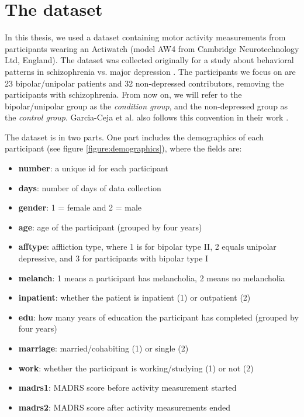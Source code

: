 %

\section{The dataset}

In this thesis, we used a dataset containing motor activity measurements from participants wearing an Actiwatch (model AW4 from Cambridge Neurotechnology Ltd, England). The dataset was collected originally for a study about behavioral patterns in schizophrenia vs. major depression \cite{Berle2010}. The participants we focus on are 23 bipolar/unipolar patients and 32 non-depressed contributors, removing the participants with schizophrenia. From now on, we will refer to the bipolar/unipolar group as the \textit{condition group}, and the non-depressed group as the \textit{control group}. Garcia-Ceja et al. also follows this convention in their work \cite{GarciaCeja2018_classification_bipolar}.

The dataset is in two parts. One part includes the demographics of each participant (see figure \ref{figure:demographics}), where the fields are:

\begin{itemize}
    \item \textbf{number}: a unique id for each participant
    \item \textbf{days}: number of days of data collection 
    \item \textbf{gender}: 1 = female and 2 = male
    \item \textbf{age}: age of the participant (grouped by four years)
    \item \textbf{afftype}: affliction type, where 1 is for bipolar type II, 2 equals unipolar depressive, and 3 for participants with bipolar type I
    \item \textbf{melanch}: 1 means a participant has melancholia, 2 means no melancholia
    \item \textbf{inpatient}: whether the patient is inpatient (1) or outpatient (2)
    \item \textbf{edu}: how many years of education the participant has completed (grouped by four years)
    \item \textbf{marriage}: married/cohabiting (1) or single (2)
    \item \textbf{work}: whether the participant is working/studying (1) or not (2)
    \item \textbf{madrs1}: MADRS score before activity measurement started
    \item \textbf{madrs2}: MADRS score after activity measurements ended
\end{itemize}

